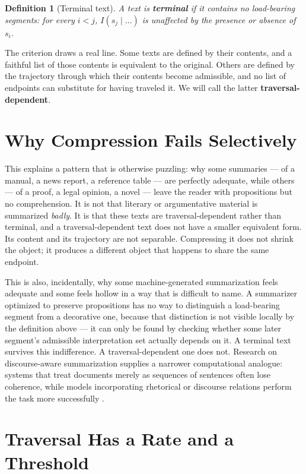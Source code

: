 \documentclass[11pt]{article}
\newtheorem{definition}{Definition}
\begin{document}
\begin{definition}[Terminal text]
A text is \textbf{terminal} if it contains no load-bearing segments: for every $i < j$, $I(s_j \mid \ldots) $ is unaffected by the presence or absence of $s_i$.
\end{definition}

The criterion draws a real line. Some texts are defined by their contents, and a faithful list of those contents is equivalent to the original. Others are defined by the trajectory through which their contents become admissible, and no list of endpoints can substitute for having traveled it. We will call the latter \textbf{traversal-dependent}.

\section{Why Compression Fails Selectively}

This explains a pattern that is otherwise puzzling: why some summaries --- of a manual, a news report, a reference table --- are perfectly adequate, while others --- of a proof, a legal opinion, a novel --- leave the reader with propositions but no comprehension. It is not that literary or argumentative material is summarized \emph{badly}. It is that these texts are traversal-dependent rather than terminal, and a traversal-dependent text does not have a smaller equivalent form. Its content and its trajectory are not separable. Compressing it does not shrink the object; it produces a different object that happens to share the same endpoint.

This is also, incidentally, why some machine-generated summarization feels adequate and some feels hollow in a way that is difficult to name. A summarizer optimized to preserve propositions has no way to distinguish a load-bearing segment from a decorative one, because that distinction is not visible locally by the definition above --- it can only be found by checking whether some later segment's admissible interpretation set actually depends on it. A terminal text survives this indifference. A traversal-dependent one does not. Research on discourse-aware summarization supplies a narrower computational analogue: systems that treat documents merely as sequences of sentences often lose coherence, while models incorporating rhetorical or discourse relations perform the task more successfully \citep{kikuchi2014,xu2020}.

\section{Traversal Has a Rate and a Threshold}
\end{document}
